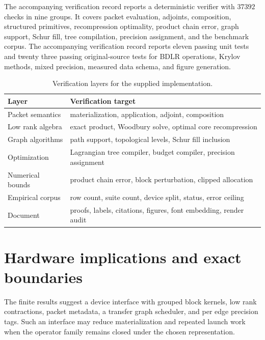 The accompanying verification record reports a deterministic verifier with $37392$ checks in nine groups. It covers packet evaluation, adjoints, composition, structured primitives, recompression optimality, product chain error, graph support, Schur fill, tree compilation, precision assignment, and the benchmark corpus. The accompanying verification record reports eleven passing unit tests and twenty three passing original-source tests for BDLR operations, Krylov methods, mixed precision, measured data schema, and figure generation.

\begin{table}[t]
\centering
\small
\begin{tabular}{>{\raggedright\arraybackslash}p{}>{\raggedright\arraybackslash}p{}}
\toprule
Layer & Verification target \\
\midrule
Packet semantics & materialization, application, adjoint, composition \\
Low rank algebra & exact product, Woodbury solve, optimal core recompression \\
Graph algorithms & path support, topological levels, Schur fill inclusion \\
Optimization & Lagrangian tree compiler, budget compiler, precision assignment \\
Numerical bounds & product chain error, block perturbation, clipped allocation \\
Empirical corpus & row count, suite count, device split, status, error ceiling \\
Document & proofs, labels, citations, figures, font embedding, render audit \\
\bottomrule
\end{tabular}
\caption{Verification layers for the supplied implementation.}
\label{tab:verification_layers}
\end{table}

\section{Hardware implications and exact boundaries}\label{main:section:014}\label{sec:boundaries}

The finite results suggest a device interface with grouped block kernels, low rank contractions, packet metadata, a transfer graph scheduler, and per edge precision tags. Such an interface may reduce materialization and repeated launch work when the operator family remains closed under the chosen representation.

